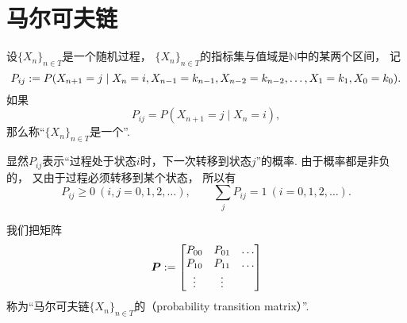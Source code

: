 \section{马尔可夫链}
\begin{definition}
设\(\{X_n\}_{n \in T}\)是一个随机过程，
\(\{X_n\}_{n \in T}\)的指标集与值域是\(\mathbb{N}\)中的某两个区间，
记\begin{equation*}
	P_{ij}
	:=
	P(
		X_{n+1} = j
		\mid
		X_n = i,
		X_{n-1} = k_{n-1},
		X_{n-2} = k_{n-2},
		\dotsc,
		X_1 = k_1,
		X_0 = k_0
	).
\end{equation*}
如果\begin{equation*}
	P_{ij}
	= P(
		X_{n+1} = j
		\mid
		X_n = i
	),
\end{equation*}
那么称“\(\{X_n\}_{n \in T}\)是一个”.
\end{definition}

显然\(P_{ij}\)表示“过程处于状态\(i\)时，下一次转移到状态\(j\)”的概率.
由于概率都是非负的，
又由于过程必须转移到某个状态，
所以有\begin{equation*}
	P_{ij} \geq 0\ (i,j=0,1,2,\dotsc),
	\qquad
	\sum_j P_{ij} = 1\ (i=0,1,2,\dotsc).
\end{equation*}

我们把矩阵\begin{equation*}
	\boldsymbol{P}
	:= \begin{bmatrix}
		P_{00} & P_{01} & \dots \\
		P_{10} & P_{11} & \dots \\
		\vdots & \vdots & \\
	\end{bmatrix}
\end{equation*}
称为“马尔可夫链\(\{X_n\}_{n \in T}\)的（probability transition matrix）”.
